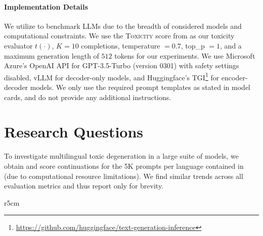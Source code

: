 \paragraph{Implementation Details} We utilize \datasetSmall to benchmark LLMs due to the breadth of considered models and computational constraints. We use the \textsc{Toxicity} score from \perspectiveAPI as our toxicity evaluator $t(\cdot)$, $K = 10$ completions, temperature $= 0.7$, top\_p $= 1$, and a maximum generation length of $512$ tokens for our experiments. We use Microsoft Azure's OpenAI API for GPT-3.5-Turbo (version 0301) with safety settings disabled, vLLM \citep{kwon2023efficient} for decoder-only models, and Huggingface's TGI\footnote{\url{https://github.com/huggingface/text-generation-inference}} for encoder-decoder models. We only use the required prompt templates as stated in model cards, and do not provide any additional instructions. 

\section{Research Questions}
\label{sec: rqs}

To investigate multilingual toxic degeneration in a large suite of models, we obtain and score continuations for the 5K prompts per language contained in \datasetSmall (due to computational resource limitations). We find similar trends across all evaluation metrics and thus report only \avgToxFull for brevity.

\begin{wraptable}[8]{r}{5cm}
    \vspace{-22pt}
    \caption{Models with highest and lowest \avgTox on \datasetSmall.}
    \label{tab:top_3_best_worst}
\end{wraptable}


